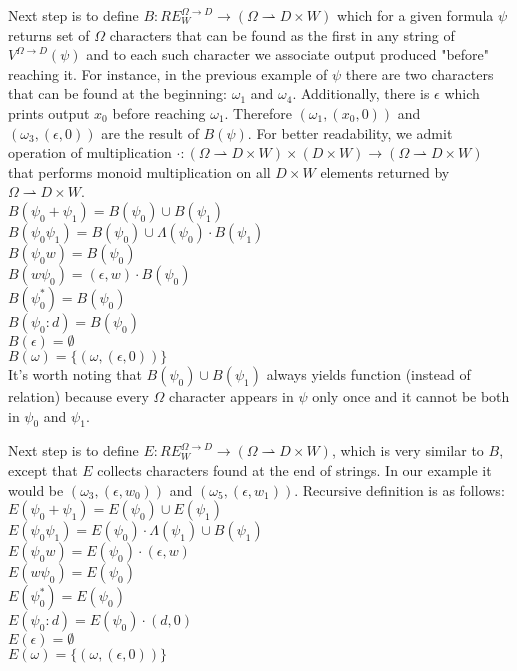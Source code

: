 \documentclass[journal]{journal}
\begin{document}
Next step is to define $B:RE_W^{\Omega\rightarrow D} \rightarrow (\Omega \rightharpoonup D \times W)$ which for a given formula $\psi$ returns set of $\Omega$ characters that can be found as the first in any string of $V^{\Omega\rightarrow D}(\psi)$ and to each such character we associate output produced "before" reaching it. For instance, in the previous example of $\psi$ there are two characters that can be found at the beginning: $\omega_1$ and $\omega_4$. Additionally, there is $\epsilon$ which prints output $x_0$ before reaching $\omega_1$. Therefore $(\omega_1,(x_0,0))$ and $(\omega_3,(\epsilon,0))$ are the result of $B(\psi)$. For better readability, we admit operation of multiplication $\cdot : (\Omega \rightharpoonup D \times W) \times (D \times W) \rightarrow (\Omega \rightharpoonup D \times W)$ that performs monoid multiplication on all $D \times W$ elements returned by $\Omega \rightharpoonup D \times W$. \\
$B(\psi_0 + \psi_1) = B(\psi_0)\cup B(\psi_1) $ \\
$B(\psi_0 \psi_1) = B(\psi_0) \cup \Lambda(\psi_0)\cdot B(\psi_1)$ \\
$B(\psi_0 w) = B(\psi_0)$ \\
$B(w \psi_0 ) = (\epsilon,w)\cdot B(\psi_0)$ \\
$B(\psi_0^*) =  B(\psi_0)$ \\
$B(\psi_0 : d) =  B(\psi_0)$ \\
$B(\epsilon) =  \emptyset$ \\
$B(\omega) =  \{(\omega,(\epsilon,0)) \}$ \\
It's worth noting that $B(\psi_0)\cup B(\psi_1)$ always yields function  (instead of relation) because every $\Omega$ character appears in $\psi$ only once and it cannot be both in $\psi_0$ and $\psi_1$. 

Next step is to define $E:RE_W^{\Omega\rightarrow D} \rightarrow (\Omega \rightharpoonup D \times W)$, which is very similar to $B$, except that $E$ collects characters found at the end of strings. In our example it would be $(\omega_3,(\epsilon,w_0))$ and $(\omega_5,(\epsilon,w_1))$. Recursive definition is as follows:\\ 
$E(\psi_0 + \psi_1) = E(\psi_0)\cup E(\psi_1) $ \\
$E(\psi_0 \psi_1) = E(\psi_0) \cdot \Lambda(\psi_1) \cup  B(\psi_1)$ \\
$E(\psi_0 w) = E(\psi_0) \cdot (\epsilon,w) $ \\
$E(w \psi_0 ) = E(\psi_0)$ \\
$E(\psi_0 ^*) =  E(\psi_0) $ \\
$E(\psi_0 : d) =  E(\psi_0) \cdot (d,0)$ \\
$E(\epsilon) =  \emptyset$ \\
$E(\omega) =  \{(\omega,(\epsilon,0)) \}$ 
\end{document}
